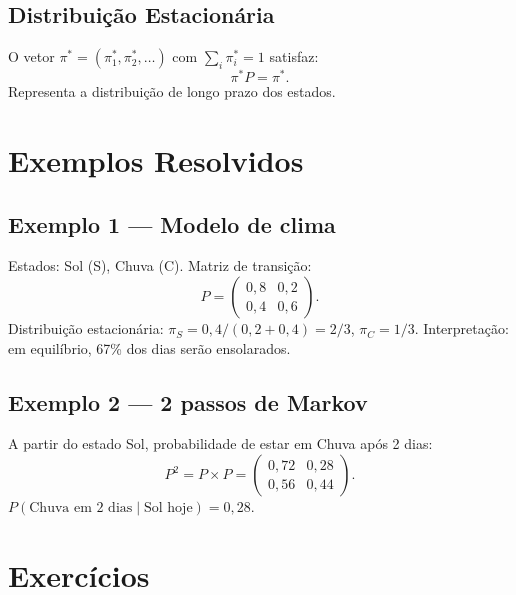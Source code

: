 \documentclass[12pt,a4paper]{article}
\begin{document}
\subsection*{Distribui\c{c}\~ao Estacion\'aria}
O vetor $\pi^* = (\pi_1^*, \pi_2^*, \ldots)$ com $\sum_i \pi_i^* = 1$ satisfaz:
\[
\pi^* P = \pi^*.
\]
Representa a distribui\c{c}\~ao de longo prazo dos estados.

\section*{Exemplos Resolvidos}

\subsection*{Exemplo 1 --- Modelo de clima}
Estados: Sol (S), Chuva (C). Matriz de transi\c{c}\~ao:
\[
P = \begin{pmatrix} 0{,}8 & 0{,}2 \\ 0{,}4 & 0{,}6 \end{pmatrix}.
\]
Distribui\c{c}\~ao estacion\'aria: $\pi_S = 0{,}4/(0{,}2+0{,}4) = 2/3$, $\pi_C = 1/3$.
Interpreta\c{c}\~ao: em equil\'ibrio, 67\% dos dias ser\~ao ensolarados.

\subsection*{Exemplo 2 --- 2 passos de Markov}
A partir do estado Sol, probabilidade de estar em Chuva ap\'os 2 dias:
\[
P^2 = P\times P = \begin{pmatrix} 0{,}72 & 0{,}28 \\ 0{,}56 & 0{,}44 \end{pmatrix}.
\]
$P(\text{Chuva em 2 dias} \mid \text{Sol hoje}) = 0{,}28$.

\section*{Exerc\'icios}
\end{document}
